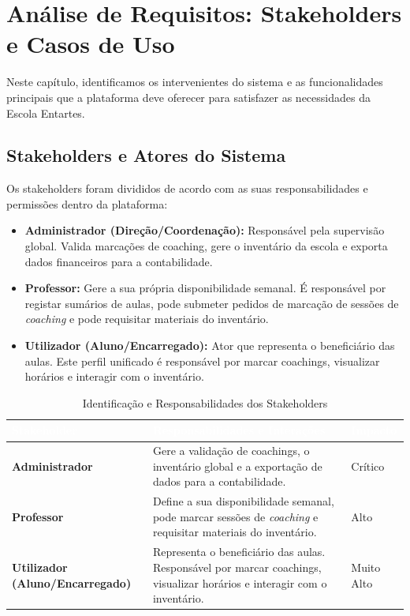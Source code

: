 \documentclass[12pt,a4paper]{report}
\begin{document}
\chapter{Análise de Requisitos: Stakeholders e Casos de Uso}

Neste capítulo, identificamos os intervenientes do sistema e as funcionalidades principais que a plataforma deve oferecer para satisfazer as necessidades da Escola Entartes.

\section{Stakeholders e Atores do Sistema}
Os stakeholders foram divididos de acordo com as suas responsabilidades e permissões dentro da plataforma:

\begin{itemize}
    \item \textbf{Administrador (Direção/Coordenação):} Responsável pela supervisão global. Valida marcações de coaching, gere o inventário da escola e exporta dados financeiros para a contabilidade.
    \item \textbf{Professor:} Gere a sua própria disponibilidade semanal. É responsável por registar sumários de aulas, pode submeter pedidos de marcação de sessões de \textit{coaching} e pode requisitar materiais do inventário.
    \item \textbf{Utilizador (Aluno/Encarregado):} Ator que representa o beneficiário das aulas. Este perfil unificado é responsável por marcar coachings, visualizar horários e interagir com o inventário.
\end{itemize}

\begin{table}[H]
\centering
\begin{tabularx}{\textwidth}{@{}l|X|l@{}}
\toprule
\rowcolor{headerblue} 
\textbf{\textcolor{white}{Stakeholder}} & \textbf{\textcolor{white}{Responsabilidades e Interações}} & \textbf{\textcolor{white}{Impacto}} \\ \midrule
\textbf{Administrador} & Gere a validação de coachings, o inventário global e a exportação de dados para a contabilidade. & Crítico \\ \midrule
\textbf{Professor} & Define a sua disponibilidade semanal, pode marcar sessões de \textit{coaching} e requisitar materiais do inventário. & Alto \\ \midrule
\textbf{Utilizador (Aluno/Encarregado)} & Representa o beneficiário das aulas. Responsável por marcar coachings, visualizar horários e interagir com o inventário. & Muito Alto \\ \bottomrule
\end{tabularx}
\caption{Identificação e Responsabilidades dos Stakeholders}
\label{tab:stakeholders}
\end{table}
\end{document}

